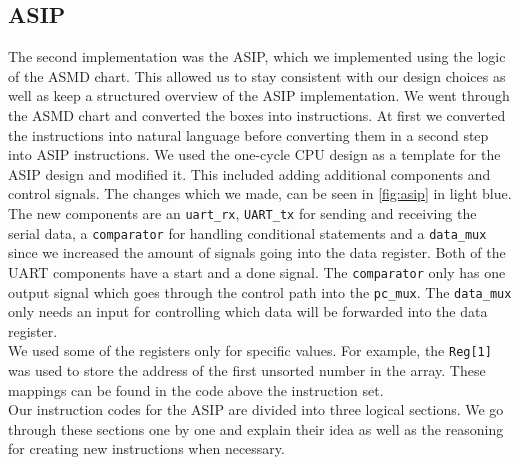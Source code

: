 \documentclass[conference]{IEEEtran}
\begin{document}
\subsection{ASIP}
The second implementation was the ASIP, which we implemented using the logic of the ASMD chart. This allowed us to stay consistent with our design choices as well as keep a structured overview of the ASIP implementation. We went through the ASMD chart and converted the boxes into instructions. At first we converted the instructions into natural language before converting them in a second step into ASIP instructions. We used the one-cycle CPU design as a template for the ASIP design and modified it. This included adding additional components and control signals. The changes which we made, can be seen in \ref{fig:asip} in light blue. The new components are an \texttt{uart\_rx}, \texttt{UART\_tx} for sending and receiving the serial data, a \texttt{comparator} for handling conditional statements and a \texttt{data\_mux} since we increased the amount of signals going into the data register. Both of the UART components have a start and a done signal. The \texttt{comparator} only has one output signal which goes through the control path into the \texttt{pc\_mux}. The \texttt{data\_mux} only needs an input for controlling which data will be forwarded into the data register.\\
We used some of the registers only for specific values. For example, the \texttt{Reg[1]} was used to store the address of the first unsorted number in the array. These mappings can be found in the code above the instruction set.\\
Our instruction codes for the ASIP are divided into three logical sections. We go through these sections one by one and explain their idea as well as the reasoning for creating new instructions when necessary.\\
\end{document}

